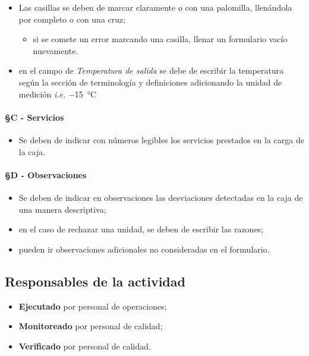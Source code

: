 \begin{itemize}
	\item Las casillas se deben de marcar claramente o con una palomilla, llenándola por completo o con una cruz;
	\begin{itemize}
		\item si se comete un error marcando una casilla, llenar un formulario vacío nuevamente.
	\end{itemize}
	\item en el campo de \emph{Temperatura de salida} se debe de escribir la temperatura según la sección de terminología y definiciones adicionando la unidad de medición \emph{i.e.} \SI{-15}{\celsius}
\end{itemize}

\paragraph{§C - Servicios}

\begin{itemize}
	\item Se deben de indicar con números legibles los servicios prestados en la carga de la caja.
\end{itemize}

\paragraph{§D - Observaciones}

\begin{itemize}
	\item Se deben de indicar en observaciones las desviaciones detectadas en la caja de una manera descriptiva;
	\item en el caso de rechazar una unidad, se deben de escribir las razones;
	\item pueden ir observaciones adicionales no consideradas en el formulario.
\end{itemize}

\subsection{Responsables de la actividad}

\begin{itemize}
	\item \textbf{Ejecutado} por personal de operaciones;
	\item \textbf{Monitoreado} por personal de calidad;
	\item \textbf{Verificado} por personal de calidad.
\end{itemize}

